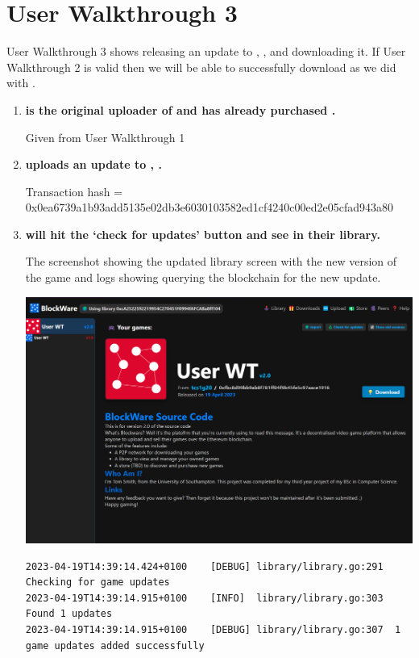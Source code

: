 \section*{User Walkthrough 3}

User Walkthrough 3 shows  releasing an update to , , and  downloading it. If User Walkthrough 2 is valid then we will be able to successfully download  as we did with .

\begin{enumerate}[itemsep=2.5pt]

  \item \textbf{ is the original uploader of  and  has already purchased .}

  Given from User Walkthrough 1

  \item \textbf{ uploads an update to , .}

  \small Transaction hash = 0x0ea6739a1b93add5135e02db3e6030103582ed1cf4240c00ed2e05cfad943a80\normalsize

  \item \textbf{ will hit the `check for updates' button and see  in their library.}
  
  The screenshot showing the updated library screen with the new version of the game and logs showing  querying the blockchain for the new update.


  \includegraphics[width=.45\textwidth]{assets/images/user-walkthrough/3/new-library.png}

\begin{lstlisting}[breaklines=true, postbreak=\mbox{\textcolor{red}{$\hookrightarrow$}\space}]
2023-04-19T14:39:14.424+0100	[DEBUG]	library/library.go:291	Checking for game updates
2023-04-19T14:39:14.915+0100	[INFO]	library/library.go:303	Found 1 updates
2023-04-19T14:39:14.915+0100	[DEBUG]	library/library.go:307	1 game updates added successfully
\end{lstlisting}
  

\end{enumerate}